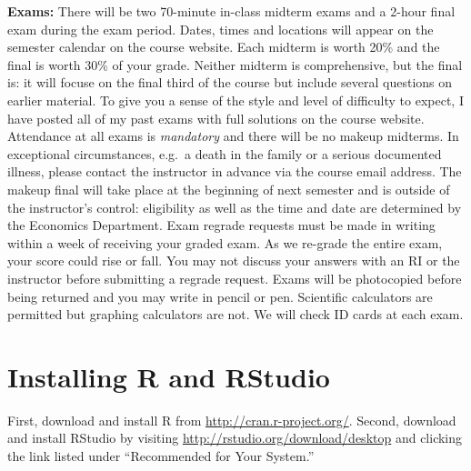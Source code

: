 \documentclass[11pt, letterpaper]{article}
\begin{document}
\medskip

\noindent \textbf{Exams:} 
There will be two 70-minute in-class midterm exams and a 2-hour final exam during the exam period.
Dates, times and locations will appear on the semester calendar on the course website.
Each midterm is worth 20\% and the final is worth 30\% of your grade.
Neither midterm is comprehensive, but the final is: it will focuse on the final third of the course but include several questions on earlier material.
To give you a sense of the style and level of difficulty to expect, I have posted all of my past exams with full solutions on the course website.
Attendance at all exams is \emph{mandatory} and there will be no makeup midterms.
In exceptional circumstances, e.g.\ a death in the family or a serious documented illness, please contact the instructor in advance via the course email address.
The makeup final will take place at the beginning of next semester and is outside of the instructor's control: eligibility as well as the time and date are determined by the Economics Department. 
Exam regrade requests must be made in writing within a week of receiving your graded exam. 
As we re-grade the entire exam, your score could rise or fall. 
You may not discuss your answers with an RI or the instructor before submitting a regrade request. 
Exams will be photocopied before being returned and you may write in pencil or pen. 
Scientific calculators are permitted but graphing calculators are not. 
We will check ID cards at each exam.
            
\section*{Installing R and RStudio} First, download and install R from \url{http://cran.r-project.org/}. Second, download and install RStudio by visiting \url{http://rstudio.org/download/desktop} and clicking the link listed under ``Recommended for Your System.'' 

\bigskip
\end{document}
